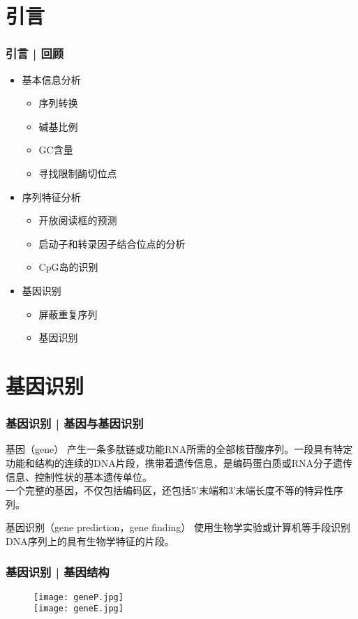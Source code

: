 \section{引言}
\begin{frame}
	\frametitle{引言 | 回顾}
	\begin{itemize}[<+-|alert@+>]
		\item 基本信息分析
			\begin{itemize}
				\item 序列转换
				\item 碱基比例
				\item GC含量
				\item 寻找限制酶切位点
			\end{itemize}
		\item 序列特征分析
			\begin{itemize}
				\item 开放阅读框的预测
				\item 启动子和转录因子结合位点的分析
				\item CpG岛的识别
			\end{itemize}
		\item 基因识别
			\begin{itemize}
				\item 屏蔽重复序列
				\item 基因识别
			\end{itemize}
	\end{itemize}
\end{frame}

\section{基因识别}
\begin{frame}
	\frametitle{基因识别 | 基因与基因识别}
	\begin{block}{基因（gene）}
		产生一条多肽链或功能RNA所需的全部核苷酸序列。一段具有特定功能和结构的连续的DNA片段，携带着遗传信息，是编码蛋白质或RNA分子遗传信息、控制性状的基本遗传单位。\\
		一个完整的基因，不仅包括编码区，还包括5'末端和3'末端长度不等的特异性序列。
	\end{block}
	\pause
	\begin{block}{基因识别（gene prediction，gene finding）}
		使用生物学实验或计算机等手段识别DNA序列上的具有生物学特征的片段。
	\end{block}
\end{frame}

\begin{frame}
	\frametitle{基因识别 | 基因结构}
	\begin{figure}
		\centering
		\texttt{[image: geneP.jpg]}
		\\
		\texttt{[image: geneE.jpg]}
	\end{figure}
\end{frame}

